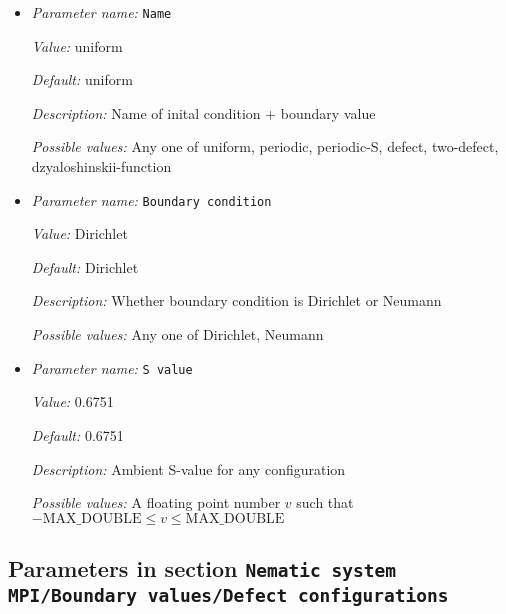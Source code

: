 \begin{itemize}
\item {\it Parameter name:} {\tt Name}
\label{parameters:Nematic system MPI/Boundary values/Name}
\label{parameters:Nematic_20system_20MPI/Boundary_20values/Name}


{\it Value:} uniform


{\it Default:} uniform


{\it Description:} Name of inital condition + boundary value


{\it Possible values:} Any one of uniform, periodic, periodic-S, defect, two-defect, dzyaloshinskii-function
\item {\it Parameter name:} {\tt Boundary condition}
\label{parameters:Nematic system MPI/Boundary values/Boundary condition}
\label{parameters:Nematic_20system_20MPI/Boundary_20values/Boundary_20condition}


{\it Value:} Dirichlet


{\it Default:} Dirichlet


{\it Description:} Whether boundary condition is Dirichlet or Neumann


{\it Possible values:} Any one of Dirichlet, Neumann
\item {\it Parameter name:} {\tt S value}
\label{parameters:Nematic system MPI/Boundary values/S value}
\label{parameters:Nematic_20system_20MPI/Boundary_20values/S_20value}


{\it Value:} 0.6751


{\it Default:} 0.6751


{\it Description:} Ambient S-value for any configuration


{\it Possible values:} A floating point number $v$ such that $-\text{MAX\_DOUBLE} \leq v \leq \text{MAX\_DOUBLE}$
\end{itemize}



\subsection{Parameters in section \tt Nematic system MPI/Boundary values/Defect configurations}
\label{parameters:Nematic_20system_20MPI/Boundary_20values/Defect_20configurations}

